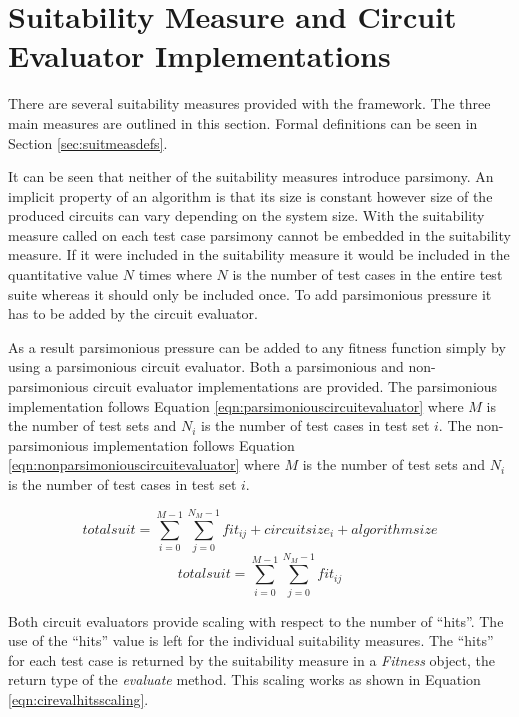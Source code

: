 \section{Suitability Measure and Circuit Evaluator Implementations}
\label{sec:provsuitmeas}

There are several suitability measures provided with the framework.
The three main measures are outlined in this section.
Formal definitions can be seen in Section \ref{sec:suitmeasdefs}.

It can be seen that neither of the suitability measures introduce parsimony.
An implicit property of an algorithm is that its size is constant however size of the produced circuits can vary depending on the system size.
With the suitability measure called on each test case parsimony cannot be embedded in the suitability measure.
If it were included in the suitability measure it would be included in the quantitative value $N$ times where $N$ is the number of test cases in the entire test suite whereas it should only be included once.
To add parsimonious pressure it has to be added by the circuit evaluator.

As a result parsimonious pressure can be added to any fitness function simply by using a parsimonious circuit evaluator.
Both a parsimonious and non-parsimonious circuit evaluator implementations are provided.
The parsimonious implementation follows Equation \ref{eqn:parsimoniouscircuitevaluator} where $M$ is the number of test sets and $N_i$ is the number of test cases in test set $i$.
The non-parsimonious implementation follows Equation \ref{eqn:nonparsimoniouscircuitevaluator} where $M$ is the number of test sets and $N_i$ is the number of test cases in test set $i$.

\begin{equation}
 totalsuit = \sum_{i=0}^{M-1}\sum_{j=0}^{N_M-1}fit_{ij}+circuitsize_i+algorithmsize
\label{eqn:parsimoniouscircuitevaluator}
\end{equation}
\begin{equation}
 totalsuit = \sum_{i=0}^{M-1}\sum_{j=0}^{N_M-1}fit_{ij}
\label{eqn:nonparsimoniouscircuitevaluator}
\end{equation}

Both circuit evaluators provide scaling with respect to the number of ``hits''.
The use of the ``hits'' value is left for the individual suitability measures.
The ``hits'' for each test case is returned by the suitability measure in a \emph{Fitness} object, the return type of the \emph{evaluate} method.
This scaling works as shown in Equation \ref{eqn:cirevalhitsscaling}.

